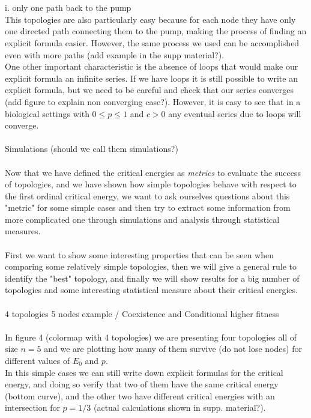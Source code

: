 \documentclass{amsart}
\theoremstyle{plain}
\numberwithin{equation}{section}
\begin{document}
\\
\\
  i. only one path back to the pump\\
  This topologies are also particularly easy because for each node they have only one directed path connecting them to the pump, making the process of finding an explicit formula easier. However, the same process we used can be accomplished even with more paths (add example in the supp material?).\\
   One other important characteristic is the absence of loops that would make our explicit formula an infinite series. If we have loops it is still possible to write an explicit formula, but we need to be careful and check that our series converges (add figure to explain non converging case?). However, it is easy to see that in a biological settings with $0\leq p\leq 1$ and $c>0$ any eventual series due to loops will converge.\\
	\\
Simulations (should we call them simulations?)\\
\\
Now that we have defined the critical energies as \textit{metrics} to evaluate the success of topologies, and we have shown how simple topologies behave with respect to the first ordinal critical energy, we want to ask ourselves questions about this "metric" for some simple cases and then try to extract some information from more complicated one through simulations and analysis through statistical measures.\\
\\
First we want to show some interesting properties that can be seen when comparing some relatively simple topologies, then we will give a general rule to identify the "best" topology, and finally we will show results for a big number of topologies and some interesting statistical measure about their critical energies.\\
\\
4 topologies 5 nodes example / Coexistence and Conditional higher fitness\\\\
In figure 4 (colormap with 4 topologies) we are presenting four topologies all of size $n=5$ and we are plotting how many of them survive (do not lose nodes) for different values of $E_0$ and $p$.\\
 In  this simple cases we can still write down explicit formulas for the critical energy, and doing so verify that two of them have the same critical energy (bottom curve), and the other two have different critical energies with an intersection for $p=1/3$ (actual calculations shown in supp. material?).\\
\end{document}
